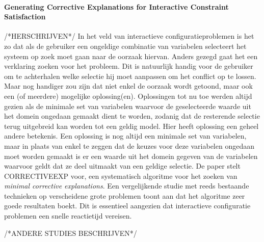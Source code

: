 \paragraph{Generating Corrective Explanations for Interactive Constraint Satisfaction \cite{o2005generating}}
/*HERSCHRIJVEN*/
In het veld van interactieve configuratieproblemen is het zo dat als de gebruiker een ongeldige combinatie van variabelen selecteert het systeem op zoek moet gaan naar de oorzaak hiervan. Anders gezegd gaat het een verklaring zoeken voor het probleem. Dit is natuurlijk handig voor de gebruiker om te achterhalen welke selectie hij moet aanpassen om het conflict op te lossen. Maar nog handiger zou zijn dat niet enkel de oorzaak wordt getoond, maar ook een (of meerdere) mogelijke oplossing(en). Oplossingen tot nu toe werden altijd gezien als de minimale set van variabelen waarvoor de geselecteerde waarde uit het domein ongedaan gemaakt dient te worden, zodanig dat de resterende selectie terug uitgebreid kan worden tot een geldig model. Hier heeft oplossing een geheel andere betekenis. Een oplossing is nog altijd een minimale set van variabelen, maar in plaats van enkel te zeggen dat de keuzes voor deze variabelen ongedaan moet worden gemaakt is er een waarde uit het domein gegeven van de variabelen waarvoor geldt dat ze deel uitmaakt van een geldige selectie. De paper stelt CORRECTIVEEXP voor, een systematisch algoritme voor het zoeken van \emph{minimal corrective explanations}. Een vergelijkende studie met reeds bestaande technieken op verscheidene grote problemen toont aan dat het algoritme zeer goede resultaten boekt. Dit is essentieel aangezien dat interactieve configuratie problemen een snelle reactietijd vereisen.

/*ANDERE STUDIES BESCHRIJVEN*/
